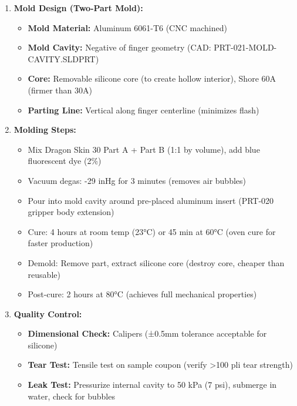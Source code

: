 \documentclass[
]{article}
\providecommand{\tightlist}{%
  \setlength{\itemsep}{0pt}\setlength{\parskip}{0pt}}
\begin{document}
\begin{enumerate}
\def\labelenumi{\arabic{enumi}.}
\tightlist
\item
  \textbf{Mold Design (Two-Part Mold):}

  \begin{itemize}
  \tightlist
  \item
    \textbf{Mold Material:} Aluminum 6061-T6 (CNC machined)
  \item
    \textbf{Mold Cavity:} Negative of finger geometry (CAD:
    PRT-021-MOLD-CAVITY.SLDPRT)
  \item
    \textbf{Core:} Removable silicone core (to create hollow interior),
    Shore 60A (firmer than 30A)
  \item
    \textbf{Parting Line:} Vertical along finger centerline (minimizes
    flash)
  \end{itemize}
\item
  \textbf{Molding Steps:}

  \begin{itemize}
  \tightlist
  \item
    Mix Dragon Skin 30 Part A + Part B (1:1 by volume), add blue
    fluorescent dye (2\%)
  \item
    Vacuum degas: -29 inHg for 3 minutes (removes air bubbles)
  \item
    Pour into mold cavity around pre-placed aluminum insert (PRT-020
    gripper body extension)
  \item
    Cure: 4 hours at room temp (23°C) or 45 min at 60°C (oven cure for
    faster production)
  \item
    Demold: Remove part, extract silicone core (destroy core, cheaper
    than reusable)
  \item
    Post-cure: 2 hours at 80°C (achieves full mechanical properties)
  \end{itemize}
\item
  \textbf{Quality Control:}

  \begin{itemize}
  \tightlist
  \item
    \textbf{Dimensional Check:} Calipers (±0.5mm tolerance acceptable
    for silicone)
  \item
    \textbf{Tear Test:} Tensile test on sample coupon (verify
    \textgreater100 pli tear strength)
  \item
    \textbf{Leak Test:} Pressurize internal cavity to 50 kPa (7 psi),
    submerge in water, check for bubbles
  \end{itemize}
\end{enumerate}
\end{document}
